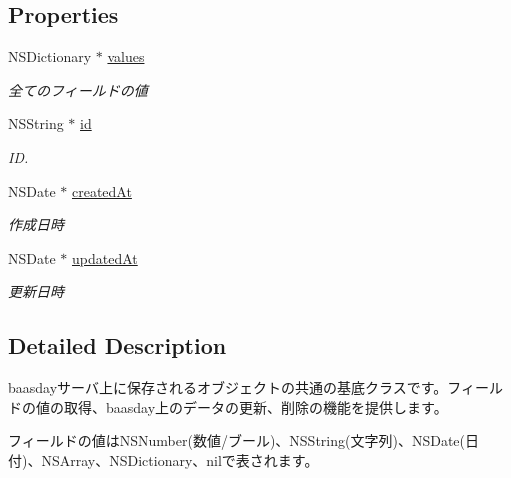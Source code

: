 \subsection*{Properties}
\begin{DoxyCompactItemize}
\item 
\hypertarget{interface_b_d_object_a69ec5b945c23ee6ecbb3b319c360924a}{N\-S\-Dictionary $\ast$ \hyperlink{interface_b_d_object_a69ec5b945c23ee6ecbb3b319c360924a}{values}}\label{interface_b_d_object_a69ec5b945c23ee6ecbb3b319c360924a}

\begin{DoxyCompactList}\small\item\em 全てのフィールドの値 \end{DoxyCompactList}\item 
N\-S\-String $\ast$ \hyperlink{interface_b_d_object_aa753599ab0726dcd36d8a3abd37281e2}{id}
\begin{DoxyCompactList}\small\item\em I\-D. \end{DoxyCompactList}\item 
N\-S\-Date $\ast$ \hyperlink{interface_b_d_object_a1e9c62e127b93ad0f7cc2d4788642ee8}{created\-At}
\begin{DoxyCompactList}\small\item\em 作成日時 \end{DoxyCompactList}\item 
N\-S\-Date $\ast$ \hyperlink{interface_b_d_object_a3b6c8264a059fb29f59829903c02a81f}{updated\-At}
\begin{DoxyCompactList}\small\item\em 更新日時 \end{DoxyCompactList}\end{DoxyCompactItemize}


\subsection{Detailed Description}
baasdayサーバ上に保存されるオブジェクトの共通の基底クラスです。フィールドの値の取得、baasday上のデータの更新、削除の機能を提供します。 

フィールドの値は\-N\-S\-Number(数値/ブール)、\-N\-S\-String(文字列)、\-N\-S\-Date(日付)、\-N\-S\-Array、\-N\-S\-Dictionary、nilで表されます。 

